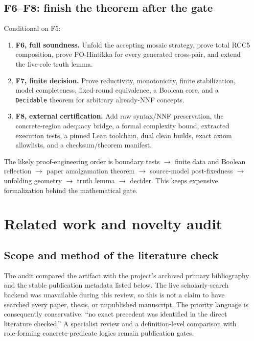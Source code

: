 \documentclass[11pt]{article}
\newcommand{\code}[1]{\texttt{#1}}
\begin{document}
\subsection{F6--F8: finish the theorem after the gate}

Conditional on F5:
\begin{enumerate}
  \item \textbf{F6, full soundness.} Unfold the accepting mosaic strategy, prove total
  RCC5 composition, prove PO-Hintikka for every generated cross-pair, and extend the
  five-role truth lemma.
  \item \textbf{F7, finite decision.} Prove reductivity, monotonicity, finite
  stabilization, model completeness, fixed-round equivalence, a Boolean core, and a
  \code{Decidable} theorem for arbitrary already-NNF concepts.
  \item \textbf{F8, external certification.} Add raw syntax/NNF preservation, the
  concrete-region adequacy bridge, a formal complexity bound, extracted execution
  tests, a pinned Lean toolchain, dual clean builds, exact axiom allowlists, and a
  checksum/theorem manifest.
\end{enumerate}

The likely proof-engineering order is boundary tests $\rightarrow$ finite data and
Boolean reflection $\rightarrow$ paper amalgamation theorem $\rightarrow$ source-model
post-fixedness $\rightarrow$ unfolding geometry $\rightarrow$ truth lemma $\rightarrow$
decider. This keeps expensive formalization behind the mathematical gate.

\section{Related work and novelty audit}

\subsection{Scope and method of the literature check}

The audit compared the artifact with the project's archived primary bibliography and
the stable publication metadata listed below. The live scholarly-search backend was
unavailable during this review, so this is not a claim to have searched every paper,
thesis, or unpublished manuscript. The priority language is consequently conservative:
``no exact precedent was identified in the direct literature checked.'' A specialist
review and a definition-level comparison with role-forming concrete-predicate logics
remain publication gates.
\end{document}
